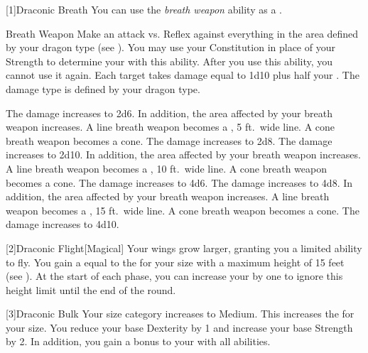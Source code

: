            [1]{Draconic Breath} You can use the \textit{breath weapon} ability as a .
            \begin{freeability}{Breath Weapon}
                Make an attack vs. Reflex against everything in the area defined by your dragon type (see ).
                You may use your Constitution in place of your Strength to determine your  with this ability.
                After you use this ability, you  cannot use it again.
                \hit Each target takes damage equal to 1d10 plus half your .
                The damage type is defined by your dragon type.

                \rankline
                 The damage increases to 2d6.
                    In addition, the area affected by your breath weapon increases.
                    A line breath weapon becomes a \arealarge, 5 ft.\ wide line.
                    A cone breath weapon becomes a \areamed cone.
                 The damage increases to 2d8.
                 The damage increases to 2d10.
                    In addition, the area affected by your breath weapon increases.
                    A line breath weapon becomes a \areahuge, 10 ft.\ wide line.
                    A cone breath weapon becomes a \arealarge cone.
                 The damage increases to 4d6.
                 The damage increases to 4d8.
                    In addition, the area affected by your breath weapon increases.
                    A line breath weapon becomes a \areagarg, 15 ft.\ wide line.
                    A cone breath weapon becomes a \areahuge cone.
                 The damage increases to 4d10.
            \end{freeability}

            [2]{Draconic Flight}[Magical] Your wings grow larger, granting you a limited ability to fly.
            You gain a  equal to the  for your size with a maximum height of 15 feet (see ).
            At the start of each phase, you can increase your  by one to ignore this height limit until the end of the round.

            [3]{Draconic Bulk} Your size category increases to Medium.
            This increases the  for your size.
            You reduce your base Dexterity by 1 and increase your base Strength by 2.
            In addition, you gain a  bonus to your  with all abilities.

